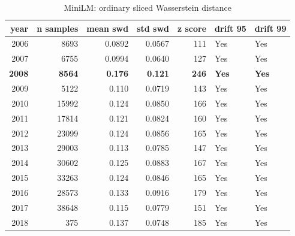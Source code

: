 \begin{table}[ht]
\centering
\caption{MiniLM: ordinary sliced Wasserstein distance}
\label{tab:minilm_ordinary_swd}
\begin{tabular}{rrrrrll}
\toprule
year & n samples & mean swd & std swd & z score & drift 95 & drift 99 \\
\midrule
2006 & 8693 & 0.0892 & 0.0567 & 111 & Yes & Yes \\
2007 & 6755 & 0.0994 & 0.0640 & 127 & Yes & Yes \\
\textbf{2008} & \textbf{8564} & \textbf{0.176} & \textbf{0.121} & \textbf{246} & \textbf{Yes} & \textbf{Yes} \\
2009 & 5122 & 0.110 & 0.0719 & 143 & Yes & Yes \\
2010 & 15992 & 0.124 & 0.0850 & 166 & Yes & Yes \\
2011 & 17814 & 0.121 & 0.0824 & 160 & Yes & Yes \\
2012 & 23099 & 0.124 & 0.0856 & 165 & Yes & Yes \\
2013 & 29003 & 0.113 & 0.0785 & 147 & Yes & Yes \\
2014 & 30602 & 0.125 & 0.0883 & 167 & Yes & Yes \\
2015 & 33263 & 0.124 & 0.0846 & 165 & Yes & Yes \\
2016 & 28573 & 0.133 & 0.0916 & 179 & Yes & Yes \\
2017 & 38648 & 0.115 & 0.0779 & 151 & Yes & Yes \\
2018 & 375 & 0.137 & 0.0748 & 185 & Yes & Yes \\
\bottomrule
\end{tabular}
\end{table}

